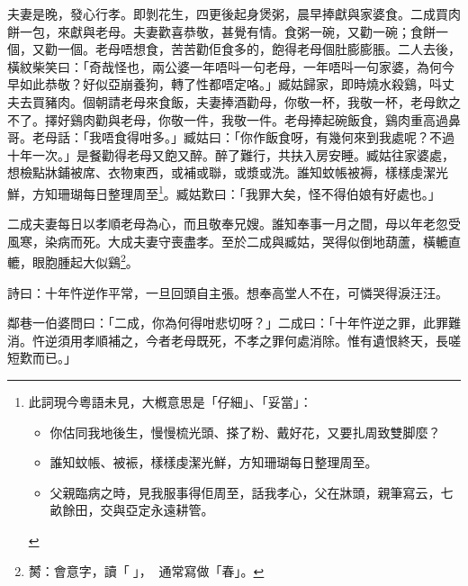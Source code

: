 \documentclass[a5paper, 12pt, openany]{book} %
\begin{document}
	夫妻是晚，發心行孝。即剝花生，四更後起身煲粥，晨早捧獻與家婆食。二成買肉餅一包，來獻與老母。夫妻歡喜恭敬，甚覺有情。食粥一碗，又勸一碗；食餅一個，又勸一個。老母唔想食，苦苦勸佢食多的，飽得老母個肚膨膨脹。二人去後，橫紋柴笑曰：「奇哉怪也，兩公婆一年唔呌一句老母，一年唔呌一句家婆，為何今早如此恭敬？好似亞崩養狗，轉了性都唔定咯。」臧姑歸家，即時燒水殺鷄，呌丈夫去買豬肉。個朝請老母來食飯，夫妻捧酒勸母，你敬一杯，我敬一杯，老母飲之不了。擇好鷄肉勸與老母，你敬一件，我敬一件。老母捧起碗飯食，鷄肉重高過鼻哥。老母話：「我唔食得咁多。」臧姑曰：「你作飯食呀，有幾何來到我處呢？不過十年一次。」是餐勸得老母又飽又醉。醉了難行，共扶入房安睡。臧姑往家婆處，想檢點牀鋪被席、衣物東西，或補或聯，或漿或洗。誰知蚊帳被褥，樣樣虔潔光鮮，方知珊瑚每日整理周至\footnote{
  此詞現今粵語未見，大槪意思是「仔細」、「妥當」：
  \begin{itemize}[itemsep=0pt, parsep=0pt]
  \item 你估同我地後生，慢慢梳光頭、搽了粉、戴好花，又要扎周致雙脚麼？
  \item 誰知蚊帳、被裖，樣樣虔潔光鮮，方知珊瑚每日整理周至。
  \item 父親臨病之時，見我服事得佢周至，話我孝心，父在牀頭，親筆寫云，七畝餘田，交與亞定永遠耕管。
\end{itemize}

}。臧姑歎曰：「我罪大矣，怪不得伯娘有好處也。」

	二成夫妻每日以孝順老母為心，而且敬奉兄嫂。誰知奉事一月之間，母以年老忽受風寒，染病而死。大成夫妻守喪盡孝。至於二成與臧姑，哭得似倒地葫蘆，橫轆直轆，眼胞腫起大似鷄\footnote{膥：會意字，讀「」，󱛖󱀱通常寫做「春」。}。

	詩曰：十年忤逆作平常，一旦回頭自主張。想奉高堂人不在，可憐哭得淚汪汪。

	鄰巷一伯婆問曰：「二成，你為何得咁悲切呀？」二成曰：「十年忤逆之罪，此罪難消。忤逆須用孝順補之，今者老母既死，不孝之罪何處消除。惟有遺恨終天，長嗟短歎而已。」
\end{document}
